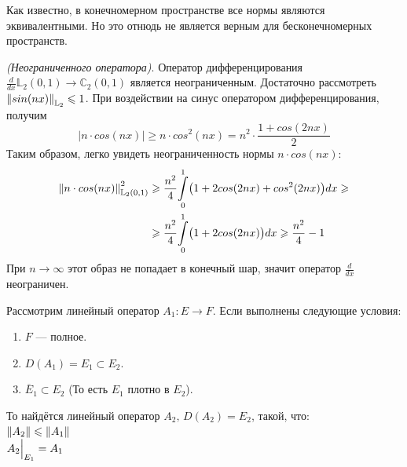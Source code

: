 \documentclass[12pt]{article}
\begin{document}
	Как известно, в конечномерном пространстве все нормы являются эквивалентными. Но это отнюдь не является верным для бесконечномерных
	пространств.
	
	\example \textit{(Неограниченного оператора)}. Оператор дифференцирования 
	$\frac{d}{dx} \mathbb{L}_2(0, 1) \rightarrow \mathbb{C}_2(0, 1)$ является неограниченным. 
	Достаточно рассмотреть $\left\| sin(nx) \right\|_{\mathbb{L}_2} \leqslant 1$. При воздействии на синус оператором дифференцирования, получим
	$$|n \cdot cos(nx)| \geq n \cdot cos^2(nx) = n^2 \cdot \frac{1 + cos(2nx)}{2}$$
	Таким образом, легко увидеть неограниченность нормы $n \cdot cos(nx)$:
	\begin{align*}
		\left\| n \cdot cos(nx) \right\|_{\mathbb{L}_2(0,1)}^2 
		&\geqslant \frac{n^2}{4} \underset{0}{\overset{1}{\int}} \big(1 + 2 cos(2nx) + cos^2(2nx)\big) dx \geqslant \\
		&\geqslant \frac{n^2}{4} \underset{0}{\overset{1}{\int}} \big(1 + 2 cos(2nx)\big) dx \geqslant \frac{n^2}{4} - 1
	\end{align*}
	При $n \rightarrow \infty$ этот образ не попадает в конечный шар, значит оператор $\frac{d}{dx}$ неограничен.
	
	
	\begin{theorem}
		Рассмотрим линейный оператор $A_1 : E \rightarrow F$. Если выполнены следующие условия:
		\begin{enumerate}
			\item $F$ --- полное.
			\item $D(A_1) = E_1 \subset E_2$.
			\item $\overline{E}_1 \subset E_2$ (То есть $E_1$ плотно в $E_2$).
		\end{enumerate}
		То найдётся линейный оператор $A_2,\, D(A_2) = E_2$, такой, что: \\
		$\left\| A_2 \right\| \leqslant \left\| A_1 \right\|$ \\
		$A_2 \Big|_{E_1}^{} = A_1$
	\end{theorem}
	
\end{document}
